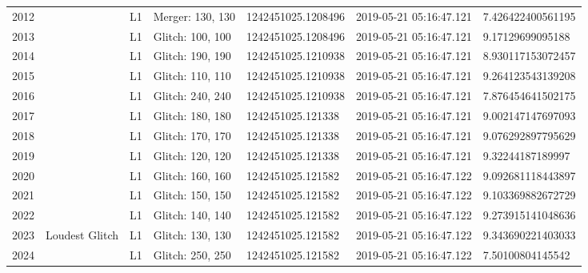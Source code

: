 \begin{longtable}{lllllll}
2012 &                                                    &       L1 &  Merger: 130, 130 &  1242451025.1208496 &  2019-05-21 05:16:47.121 &   7.426422400561195 \\
2013 &                                                    &       L1 &  Glitch: 100, 100 &  1242451025.1208496 &  2019-05-21 05:16:47.121 &    9.17129699095188 \\
2014 &                                                    &       L1 &  Glitch: 190, 190 &  1242451025.1210938 &  2019-05-21 05:16:47.121 &   8.930117153072457 \\
2015 &                                                    &       L1 &  Glitch: 110, 110 &  1242451025.1210938 &  2019-05-21 05:16:47.121 &   9.264123543139208 \\
2016 &                                                    &       L1 &  Glitch: 240, 240 &  1242451025.1210938 &  2019-05-21 05:16:47.121 &   7.876454641502175 \\
2017 &                                                    &       L1 &  Glitch: 180, 180 &   1242451025.121338 &  2019-05-21 05:16:47.121 &   9.002147147697093 \\
2018 &                                                    &       L1 &  Glitch: 170, 170 &   1242451025.121338 &  2019-05-21 05:16:47.121 &   9.076292897795629 \\
2019 &                                                    &       L1 &  Glitch: 120, 120 &   1242451025.121338 &  2019-05-21 05:16:47.121 &    9.32244187189997 \\
2020 &                                                    &       L1 &  Glitch: 160, 160 &   1242451025.121582 &  2019-05-21 05:16:47.122 &   9.092681118443897 \\
2021 &                                                    &       L1 &  Glitch: 150, 150 &   1242451025.121582 &  2019-05-21 05:16:47.122 &   9.103369882672729 \\
2022 &                                                    &       L1 &  Glitch: 140, 140 &   1242451025.121582 &  2019-05-21 05:16:47.122 &   9.273915141048636 \\
2023 &                                     Loudest Glitch &       L1 &  Glitch: 130, 130 &   1242451025.121582 &  2019-05-21 05:16:47.122 &   9.343690221403033 \\
2024 &                                                    &       L1 &  Glitch: 250, 250 &   1242451025.121582 &  2019-05-21 05:16:47.122 &    7.50100804145542 \\

\end{longtable}
